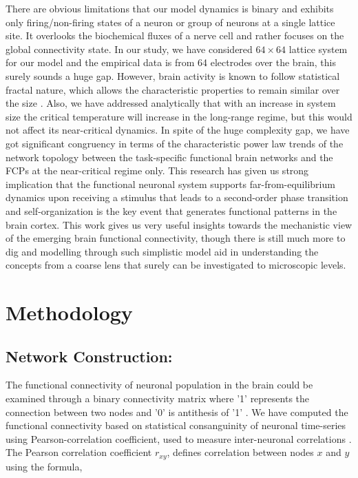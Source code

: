 \documentclass[preprintnumbers,amsmath,amssymb,onecolumn]{revtex4}
\begin{document}
{\noindent}There are obvious limitations that our model dynamics is binary and exhibits only firing/non-firing states of a neuron or group of neurons at a single lattice site. It overlooks the biochemical fluxes of a nerve cell and rather focuses on the global connectivity state. In our study, we have considered $64\times 64$ lattice system for our model and the empirical data is from 64 electrodes over the brain, this surely sounds a huge gap. However, brain activity is known to follow statistical fractal nature, which allows the characteristic properties to remain similar over the size \citep{Franca2018}. Also, we have addressed analytically that with an increase in system size the critical temperature will increase in the long-range regime, but this would not affect its near-critical dynamics. In spite of the huge complexity gap, we have got significant congruency in terms of the characteristic power law trends of the network topology between the task-specific functional brain networks and the FCPs at the near-critical regime only. This research has given us strong implication that the functional neuronal system supports far-from-equilibrium dynamics upon receiving a stimulus that leads to a second-order phase transition and self-organization is the key event that generates functional patterns in the brain cortex. This work gives us very useful insights towards the mechanistic view of the emerging brain functional connectivity, though there is still much more to dig and modelling through such simplistic model aid in understanding the concepts from a coarse lens that surely can be investigated to microscopic levels. \\

\section{Methodology}

\subsection{Network Construction:}

{\noindent}The functional connectivity of neuronal population in the brain could be examined through a binary connectivity matrix where '1' represents the connection between two nodes and '0' is antithesis of '1' \citep{sporns2007}. We have computed the functional connectivity based on statistical consanguinity of neuronal time-series using Pearson-correlation coefficient, used to measure inter-neuronal correlations \citep{sporns2007}. The Pearson correlation coefficient $r_{xy}$, defines correlation between nodes $x$ and $y$ using the formula,
\end{document}
